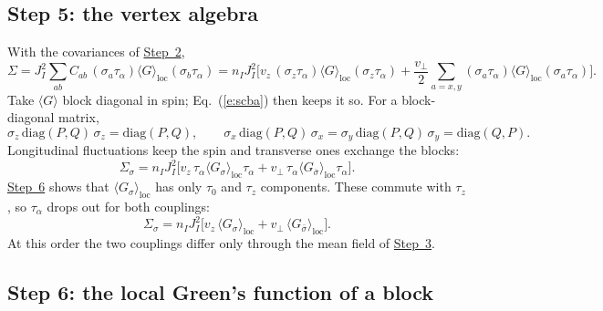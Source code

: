 \documentclass[11pt,a4paper]{article}
\begin{document}
\subsection{Step 5: the vertex algebra}\label{st:vertex}

With the covariances of \hyperref[st:disorder]{Step~2},
\begin{equation}
\Sigma = J_I^2\sum_{ab}C_{ab}\,(\sigma_a\tau_\alpha)\langle G\rangle_{\mathrm{loc}}(\sigma_b\tau_\alpha)
= n_IJ_I^2\Big[v_z\,(\sigma_z\tau_\alpha)\langle G\rangle_{\mathrm{loc}}(\sigma_z\tau_\alpha)
+\frac{v_\perp}{2}\sum_{a=x,y}(\sigma_a\tau_\alpha)\langle G\rangle_{\mathrm{loc}}(\sigma_a\tau_\alpha)\Big].
\end{equation}
Take $\langle G\rangle$ block diagonal in spin; Eq.~(\ref{e:scba}) then keeps it so. For a
block-diagonal matrix,
\begin{equation}
\sigma_z\,\mathrm{diag}(P,Q)\,\sigma_z=\mathrm{diag}(P,Q),\qquad
\sigma_x\,\mathrm{diag}(P,Q)\,\sigma_x=\sigma_y\,\mathrm{diag}(P,Q)\,\sigma_y=\mathrm{diag}(Q,P).
\end{equation}
Longitudinal fluctuations keep the spin and transverse ones exchange the blocks:
\begin{equation}
\Sigma_\sigma = n_IJ_I^2\big[v_z\,\tau_\alpha\langle G_\sigma\rangle_{\mathrm{loc}}\tau_\alpha+v_\perp\,\tau_\alpha\langle G_{\bar\sigma}\rangle_{\mathrm{loc}}\tau_\alpha\big].
\end{equation}
\hyperref[st:local]{Step~6} shows that $\langle G_\sigma\rangle_{\mathrm{loc}}$ has only $\tau_0$ and $\tau_z$ components. These
commute with $\tau_z$, so $\tau_\alpha$ drops out for both couplings:
\begin{equation}
\Sigma_\sigma = n_IJ_I^2\big[v_z\,\langle G_\sigma\rangle_{\mathrm{loc}}+v_\perp\,\langle G_{\bar\sigma}\rangle_{\mathrm{loc}}\big].
\label{e:sigmablock}
\end{equation}
At this order the two couplings differ only through the mean field of \hyperref[st:dyson]{Step~3}.

\subsection{Step 6: the local Green's function of a block}\label{st:local}
\end{document}
